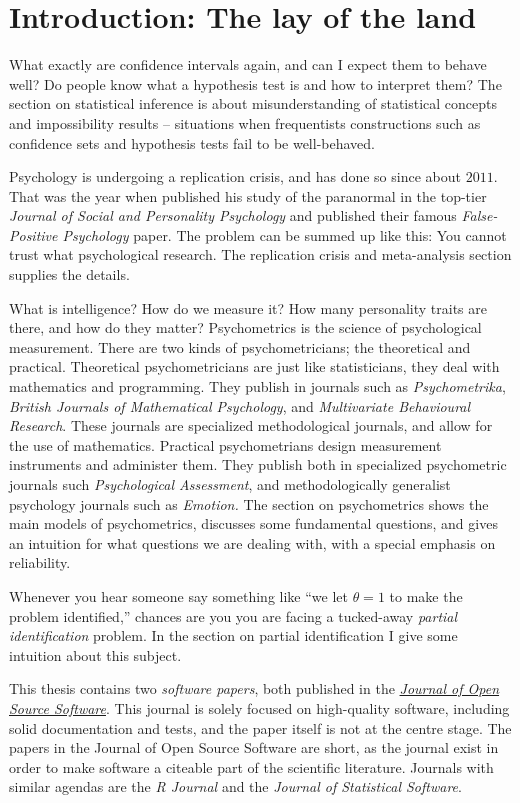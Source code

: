 \section{Introduction: The lay of the land}

What exactly are confidence intervals again, and can I expect them to behave well? Do people know what a hypothesis test is and how to interpret them? The section on statistical inference is about misunderstanding of statistical concepts and impossibility results -- situations when frequentists constructions such as confidence sets and hypothesis tests fail to be well-behaved. 

Psychology is undergoing a replication crisis, and has done so since about $2011$. That was the year when \textcite{Bem2011-vq} published his study of the paranormal in the top-tier \textit{Journal of Social and Personality Psychology} and \textcite{simmons_false-positive_2011} published their famous \textit{False-Positive Psychology} paper. The problem can be summed up like this: You cannot trust what psychological research. The replication crisis and meta-analysis section supplies the details.

What is intelligence? How do we measure it? How many personality traits are there, and how do they matter? Psychometrics is the science of psychological measurement. There are two kinds of psychometricians; the theoretical and practical. Theoretical psychometricians are just like statisticians, they deal with mathematics and programming. They publish in journals such as \textit{Psychometrika}, \textit{British Journals of Mathematical Psychology}, and \textit{Multivariate Behavioural Research}. These journals are specialized methodological journals, and allow for the use of mathematics. Practical psychometrians design measurement instruments and administer them. They publish both in specialized psychometric journals such \textit{Psychological Assessment}, and methodologically generalist psychology journals such as \textit{Emotion.} The section on psychometrics shows the main models of psychometrics, discusses some fundamental questions, and gives an intuition for what questions we are dealing with, with a special emphasis on reliability.

Whenever you hear someone say something like ``we let $\theta=1$ to make the problem identified,'' chances are you you are facing a tucked-away \textit{partial identification} problem. In the section on partial identification I give some intuition about this subject.

This thesis contains two \textit{software papers}, both published in the \href{https://joss.theoj.org/}{\textit{Journal of Open Source Software}}. This journal is solely focused on high-quality software, including solid documentation and tests, and the paper itself is not at the centre stage. The papers in the Journal of Open Source Software are short, as the journal exist in order to make software a citeable part of the scientific literature. Journals with similar agendas are the \textit{R Journal} and the \textit{Journal of Statistical Software}.